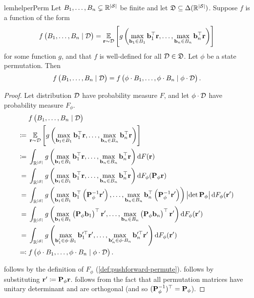\begin{restatable}{lem}{helperPerm}\label{lem:helper-perm}
Let $B_1,\ldots,B_n\subsetneq \mathbb{R}^{\left|\mathcal{S}\right|}$ be finite and let $\mathfrak{D} \subseteq \Delta(\mathbb{R}^{\left|\mathcal{S}\right|})$. Suppose $f$ is a function of the form
\begin{align}
    f\left(B_1,\ldots,B_n \mid \mathcal{D}\right)=\operatorname*{\mathbb{E}}_{\mathbf{r}\sim \mathcal{D}}\left[g\left(\max_{\mathbf{b}_1\in B_1} \mathbf{b}_1^\top \mathbf{r},\ldots, \max_{\mathbf{b}_n\in B_n} \mathbf{b}_n^\top \mathbf{r}\right)\right]\label{eq:helper}
\end{align}
for some function $g$, and that $f$ is well-defined for all $\mathcal{D} \in \mathfrak{D}$. Let $\phi$ be a state permutation. Then
\begin{equation}
    f\left(B_1,\ldots,B_n \mid \mathcal{D}\right)=f\left(\phi\cdot B_1 ,\ldots,\phi \cdot B_n \mid \phi \cdot\mathcal{D}\right).
\end{equation}
\end{restatable}
\begin{proof} Let distribution $\mathcal{D}$ have probability measure $F$, and let $\phi\cdot \mathcal{D}$ have probability measure $F_\phi$. 
\begin{align}
    &f\prn{B_1,\ldots,B_n \mid \D}\\
    \defeq{}&\E{\rf\sim \D}{g\prn{\max_{\bv_1\in B_1} \bv_1^\top \rf,\ldots, \max_{\bv_n\in B_n} \bv_n^\top \rf}}\\
    \defeq{}&\int_{\rewardVS} g\prn{\max_{\bv_1\in B_1} \bv_1^\top \rf,\ldots, \max_{\bv_n\in B_n} \bv_n^\top \rf} \dF[\rf][F]\\
    ={}&\int_{\rewardVS} g\prn{\max_{\bv_1\in B_1} \bv_1^\top \rf,\ldots, \max_{\bv_n\in B_n} \bv_n^\top \rf} \dF[\permute\rf][F_\phi]\label{eq:permute-prob-meas}\\
    ={}&\int_{\rewardVS} g\prn{\max_{\bv_1\in B_1} \bv_1^\top \prn{\permute\inv\rf'},\ldots, \max_{\bv_n\in B_n} \bv_n^\top \prn{\permute\inv\rf'}} \abs{\det \permute}\dF[\rf'][F_\phi]\label{eq:change-of-variables}\\
    ={}&\int_{\rewardVS} g\prn{\max_{\bv_1\in B_1} \prn{\permute\bv_1}^\top \rf',\ldots, \max_{\bv_n\in B_n} \prn{\permute\bv_n}^\top \rf'} \dF[\rf'][F_\phi]\label{eq:change-of-variables-2}\\
    ={}&\int_{\rewardVS} g\prn{\max_{\bv_1'\in \phi\cdot B_1} \bv_1'^{\top} \rf',\ldots, \max_{\bv_n'\in \phi\cdot B_n} \bv_n'^{\top} \rf'} \dF[\rf'][F_\phi]\\
    \eqdef{}& f\prn{\phi \cdot B_1,\ldots,\phi\cdot B_n \mid \phi\cdot \D}.
\end{align}

 follows by the definition of $F_\phi$ (\cref{def:pushforward-permute}).  follows by substituting $\mathbf{r}'\coloneqq \mathbf{P}_{\phi}\mathbf{r}$.  follows from the fact that all permutation matrices have unitary determinant and are orthogonal (and so $(\mathbf{P}_{\phi}^{-1})^\top=\mathbf{P}_{\phi}$). 
\end{proof}

